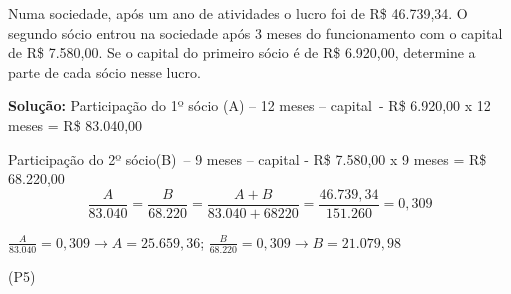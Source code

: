 \begin{texemplo}
	Numa sociedade, após um ano de atividades o lucro foi de R\$  46.739,34. O segundo sócio entrou na sociedade após 3 meses do funcionamento com o capital de R\$ 7.580,00. Se o capital do primeiro sócio é de R\$ 6.920,00, determine a parte de cada sócio nesse lucro.

	\textbf{Solução: }Participação do 1º sócio (A) – 12 meses – capital\  - R\$ 6.920,00 x 12 meses = R\$  83.040,00

	Participação do 2º sócio(B)\ – 9 meses – capital  - R\$  7.580,00 x 9 meses = R\$  68.220,00
	$$\frac{A}{83.040} = \frac{B}{68.220} = \frac{A+B}{83.040+68220} = \frac{46.739,34}{151.260} = 0,309$$

	$\frac{A}{83.040} = 0,309 \longrightarrow A = 25.659,36$; $\frac{B}{68.220} = 0,309 \longrightarrow B = 21.079,98$ \qedsymbol{}
\begin{flushright}
	(P5)
\end{flushright}
\end{texemplo}
